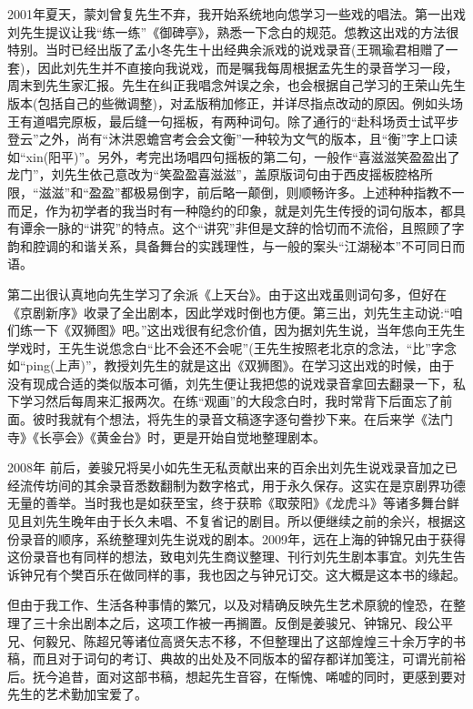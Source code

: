 {\textrm{2001}年夏天，蒙刘曾复先生不弃，我开始系统地向怹学习一些戏的唱法。第一出戏刘先生提议让我``练一练''《御碑亭》，熟悉一下念白的规范。怹教这出戏的方法很特别。当时已经出版了孟小冬先生十出经典余派戏的说戏录音(王珮瑜君相赠了一套)，因此刘先生并不直接向我说戏，而是嘱我每周根据孟先生的录音学习一段，周末到先生家汇报。先生在纠正我唱念舛误之余，也会根据自己学习的王荣山先生版本(包括自己的些微调整)，对孟版稍加修正，并详尽指点改动的原因。例如头场王有道唱完原板，最后缝一句摇板，有两种词句。除了通行的``赴科场贡士试平步登云''之外，尚有``沐洪恩蟾宫考会会文衡''一种较为文气的版本，且``衡''字上口读如``xin(阳平)''。另外，考完出场唱四句摇板的第二句，一般作``喜滋滋笑盈盈出了龙门''，刘先生依己意改为``笑盈盈喜滋滋''，盖原版词句由于西皮摇板腔格所限，``滋滋''和``盈盈''都极易倒字，前后略一颠倒，则顺畅许多。上述种种指教不一而足，作为初学者的我当时有一种隐约的印象，就是刘先生传授的词句版本，都具有谭余一脉的``讲究''的特点。这个``讲究''非但是文辞的恰切而不流俗，且照顾了字韵和腔调的和谐关系，具备舞台的实践理性，与一般的案头``江湖秘本''不可同日而语。

第二出很认真地向先生学习了余派《上天台》。由于这出戏虽则词句多，但好在《京剧新序》收录了全出剧本，因此学戏时倒也方便。第三出，刘先生主动说:``咱们练一下《双狮图》吧。''这出戏很有纪念价值，因为据刘先生说，当年怹向王先生学戏时，王先生说怹念白``比不会还不会呢''(王先生按照老北京的念法，``比''字念如``ping(上声)''，教授刘先生的就是这出《双狮图》。在学习这出戏的时候，由于没有现成合适的类似版本可循，刘先生便让我把怹的说戏录音拿回去翻录一下，私下学习然后每周来汇报两次。在练``观画''的大段念白时，我时常背下后面忘了前面。彼时我就有个想法，将先生的录音文稿逐字逐句誊抄下来。在后来学《法门寺》《长亭会》《黄金台》时，更是开始自觉地整理剧本。

\textrm{2008}年%
前后，姜骏兄将吴小如先生无私贡献出来的百余出刘先生说戏录音加之已经流传坊间的其余录音悉数翻制为数字格式，用于永久保存。这实在是京剧界功德无量的善举。当时我也是如获至宝，终于获聆《取荥阳》《龙虎斗》等诸多舞台鲜见且刘先生晚年由于长久未唱、不复省记的剧目。所以便继续之前的余兴，根据这份录音的顺序，系统整理刘先生说戏的剧本。\textrm{2009}年，远在上海的钟锦兄由于获得这份录音也有同样的想法，致电刘先生商议整理、刊行刘先生剧本事宜。刘先生告诉钟兄有个樊百乐在做同样的事，我也因之与钟兄订交。这大概是这本书的缘起。

但由于我工作、生活各种事情的繁冗，以及对精确反映先生艺术原貌的惶恐，在整理了三十余出剧本之后，这项工作被一再搁置。反倒是姜骏兄、钟锦兄、段公平兄、何毅兄、陈超兄等诸位高贤矢志不移，不但整理出了这部煌煌三十余万字的书稿，而且对于词句的考订、典故的出处及不同版本的留存都详加笺注，可谓光前裕后。抚今追昔，面对这部书稿，想起先生音容，在惭愧、唏嘘的同时，更感到要对先生的艺术勤加宝爱了。

}
